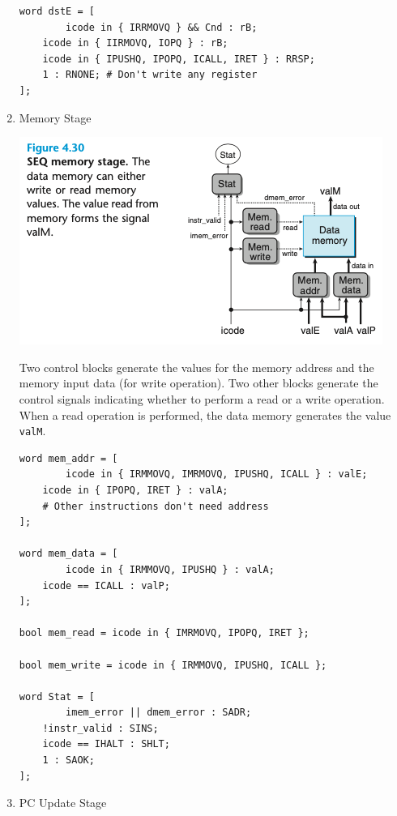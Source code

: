 \documentclass[11pt]{article}
\begin{document}
\begin{enumerate}
\begin{verbatim}
word dstE = [
        icode in { IRRMOVQ } && Cnd : rB;
	icode in { IIRMOVQ, IOPQ } : rB;
	icode in { IPUSHQ, IPOPQ, ICALL, IRET } : RRSP;
	1 : RNONE; # Don't write any register
];
\end{verbatim}

\item Memory Stage
\label{sec:org9dac20b}

\begin{center}
\includegraphics[width=.9\linewidth]{pics/figure4.30-seq-memory-stage.png}
\end{center}

Two control blocks generate the values for the memory address and the memory input data (for write operation). Two other blocks generate the control signals indicating whether to perform a read or a write operation. When a read operation is performed, the data memory generates the value \texttt{valM}.\\

\begin{verbatim}
word mem_addr = [
        icode in { IRMMOVQ, IMRMOVQ, IPUSHQ, ICALL } : valE;
	icode in { IPOPQ, IRET } : valA;
	# Other instructions don't need address
];

word mem_data = [
        icode in { IRMMOVQ, IPUSHQ } : valA;
	icode == ICALL : valP;
];

bool mem_read = icode in { IMRMOVQ, IPOPQ, IRET };

bool mem_write = icode in { IRMMOVQ, IPUSHQ, ICALL };

word Stat = [
        imem_error || dmem_error : SADR;
	!instr_valid : SINS;
	icode == IHALT : SHLT;
	1 : SAOK;
];
\end{verbatim}

\item PC Update Stage
\label{sec:org0d915fb}


\end{enumerate}
\end{document}
